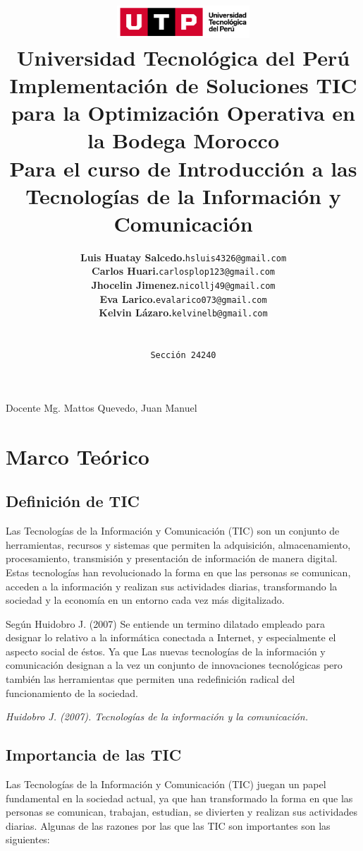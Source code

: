\documentclass{article}
\title{
  \includegraphics[width=5cm]{./assets/logo-utp.png} \\
  \vspace{1cm}
  \textbf{Universidad Tecnológica del Perú} \\
  \vspace{2cm}
  \textbf{Implementación de Soluciones TIC para la Optimización Operativa en la Bodega Morocco} \\
  \vspace{1cm}
  \large \textbf{Para el curso de Introducción a las Tecnologías de la Información y Comunicación} \\
}
\author{
  \begin{tabular}{ll}
    \textbf{Luis Huatay Salcedo.} & \texttt{hsluis4326@gmail.com} \\
    \textbf{Carlos Huari.} & \texttt{carlosplop123@gmail.com} \\
    \textbf{Jhocelin Jimenez.} & \texttt{nicollj49@gmail.com} \\
    \textbf{Eva Larico.} & \texttt{evalarico073@gmail.com} \\
    \textbf{Kelvin Lázaro.} & \texttt{kelvinelb@gmail.com} \\
  \end{tabular} \\\\
  \texttt{Sección 24240}
}
\begin{document}
\maketitle
\begin{center}
Docente Mg. Mattos Quevedo, Juan Manuel
\end{center}
\restoregeometry

\newpage 

\tableofcontents

\newpage

\section{Marco Teórico}

  \subsection{Definición de TIC}

    Las Tecnologías de la Información y Comunicación (TIC) son un conjunto de herramientas, recursos y sistemas que permiten la adquisición, almacenamiento, procesamiento, transmisión y presentación de información de manera digital. Estas tecnologías han revolucionado la forma en que las personas se comunican, acceden a la información y realizan sus actividades diarias, transformando la sociedad y la economía en un entorno cada vez más digitalizado.

    Según Huidobro J. (2007) Se entiende un termino dilatado empleado para designar lo relativo a la informática conectada a Internet, y especialmente el aspecto social de éstos. Ya que Las nuevas tecnologías de la información y comunicación designan a la vez un conjunto de innovaciones tecnológicas pero también las herramientas que permiten una redefinición radical del funcionamiento de la sociedad.

    \begin{flushright}
      \textit{Huidobro J. (2007). Tecnologías de la información y la comunicación.}
    \end{flushright}



  \subsection{Importancia de las TIC}

    Las Tecnologías de la Información y Comunicación (TIC) juegan un papel fundamental en la sociedad actual, ya que han transformado la forma en que las personas se comunican, trabajan, estudian, se divierten y realizan sus actividades diarias. Algunas de las razones por las que las TIC son importantes son las siguientes:
\end{document}
